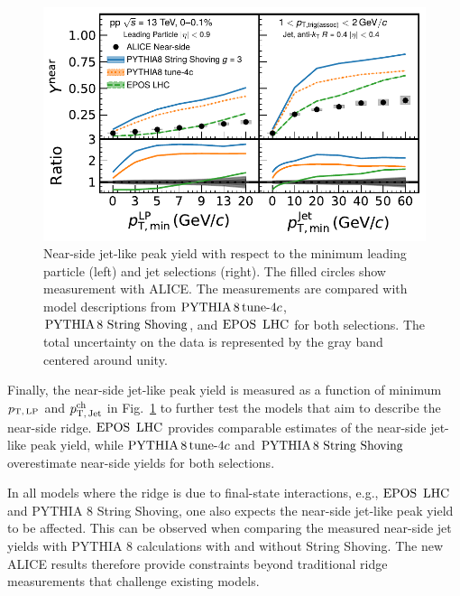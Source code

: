 \begin{figure}[h!]
	\centering
	\includegraphics[width=0.89\linewidth]{./figures/Fig9_JetYieldESE.pdf}
	\caption{ Near-side jet-like peak yield with respect to the minimum leading particle (left) and jet selections (right). The filled circles show measurement with ALICE. The measurements are compared with model descriptions from $\mathrm{PYTHIA}\,8\,\mathrm{tune}{\text -}4c$, ${\mathrm{PYTHIA}\,8~\mathrm{String}~}\mathrm{Shoving}$, and ${\mathrm{EPOS}\,~\mathrm{LHC}}$ for both selections. The total uncertainty on the data is represented by the gray
band centered around unity.}
	\label{fig:JetYield_ESE}
\end{figure}

Finally, the near-side jet-like peak yield is measured as a function of minimum $p_\mathrm{T,\,LP}$ and $p_\mathrm{T,\,Jet}^\mathrm{ch}$ in Fig.~\ref{fig:JetYield_ESE} to further test the models that aim to describe the near-side ridge.
${\mathrm{EPOS}\,~\mathrm{LHC}}$ provides comparable estimates of the near-side jet-like peak yield, while $\mathrm{PYTHIA}\,8\,\mathrm{tune}{\text -}4c$ and ${\mathrm{PYTHIA}\,8~\mathrm{String}~}\mathrm{Shoving}$ overestimate near-side yields for both selections.

In all models where the ridge is due to final-state interactions, e.g., ${\mathrm{EPOS}\,~\mathrm{LHC}}$ and PYTHIA 8 String Shoving, one also expects the near-side jet-like peak yield to be affected. This can be observed when comparing the measured near-side jet yields with PYTHIA 8 calculations with and without String Shoving. The new ALICE results therefore provide constraints beyond traditional ridge measurements that challenge existing models.